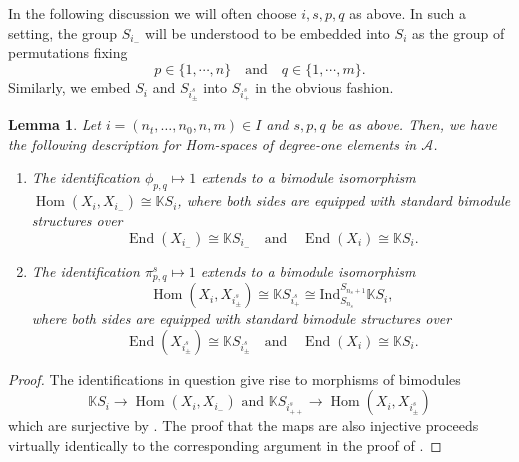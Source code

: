 \documentclass[11pt]{article}
\renewcommand{\labelenumi}{(\arabic{enumi})}
\theoremstyle{plain}
\newtheorem{lemma}{Lemma}[section]
\theoremstyle{nonumberplain}
\theoremstyle{plain}
\theoremstyle{nonumberplain}
\newtheorem{proof}{Proof}
\newcommand\bK{\mathbb K}
\newcommand\cA{\mathcal A}
\DeclareMathOperator{\End}{\mathrm{End}}
\DeclareMathOperator{\Hom}{\mathrm{Hom}}
\begin{document}
In the following discussion we will often choose $i,s,p,q$ as above. In such a setting, the group $S_{i_-}$ will be
understood to be embedded into $S_i$ as the group of permutations
fixing
\begin{equation*}
  p\in \{1,\cdots,n\} \quad\text{and} \quad q\in \{1,\cdots,m\}. 
\end{equation*}
Similarly, we embed $S_i$ and $S_{i^s_{\pm}}$ into $S_{i^s_+}$ in the
obvious fashion.


\begin{lemma}\label{le.deg-1}
  Let $i=\left(n_t,\ldots,n_0,n,m\right)\in I$ and $s,p,q$ be as above.  Then, we have the following description for Hom-spaces of degree-one elements in $\cA$.
  \begin{enumerate}
    \renewcommand{\labelenumi}{(\alph{enumi})}
  \item The identification $\phi_{p,q}\mapsto 1$ extends to a bimodule
    isomorphism $\Hom(X_i,X_{i_-})\cong \bK S_i$, where both sides are
    equipped with standard bimodule structures over
    \begin{equation*}
      \End(X_{i_-})\cong \bK S_{i_-} \quad\text{and}\quad \End(X_i)\cong \bK S_i. 
    \end{equation*}
  \item The identification $\pi^s_{p,q}\mapsto 1$ extends to a
    bimodule isomorphism
    \begin{equation*}
      \Hom(X_i,X_{i^s_{\pm}})\cong \bK S_{i^s_+}\cong \mathrm{Ind}_{S_{n_s}}^{S_{n_s+1}}\bK S_i,
    \end{equation*}
    where both sides are equipped with standard bimodule structures
    over
    \begin{equation*}
      \End(X_{i^s_{\pm}})\cong \bK S_{i^s_{\pm}} \quad\text{and}\quad \End(X_i)\cong \bK S_i. 
    \end{equation*}
  \end{enumerate}
\end{lemma}
\begin{proof}
  The identifications in question give rise to morphisms of bimodules
  \begin{equation*}
    \bK S_i\to \Hom(X_i,X_{i_-})\text{ and } \bK S_{i^s_{++}}\to \Hom(X_i,X_{i^s_{\pm}})
  \end{equation*}
  which are surjective by . The proof that the maps are also
  injective proceeds virtually identically to the corresponding
  argument in the proof of \cite[Lemma 3.24]{us2}.
\end{proof}
\end{document}
